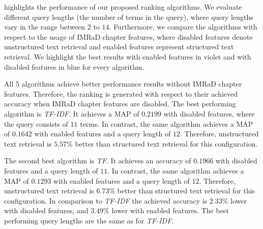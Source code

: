  highlights the performance of our proposed ranking algorithms. We evaluate different query lengths (the number of terms in the query), where query lengths vary in the range between $2$ to $14$. Furthermore, we compare the algorithms with respect to the usage of IMRaD chapter features, where disabled features denote unstructured text retrieval and enabled features represent structured text retrieval. We highlight the best results with enabled features in violet and with disabled features in blue for every algorithm.

All $5$ algorithms achieve better performance results without IMRaD chapter features. Therefore, the ranking is generated with respect to their achieved accuracy when IMRaD chapter features are disabled. The best performing algorithm is \textit{TF-IDF}. It achieves a MAP of $0.2199$ with disabled features, where the query consists of $11$ terms. In contrast, the same algorithm achieves a MAP of $0.1642$ with enabled features and a query length of $12$. Therefore, unstructured text retrieval is $5.57 \%$ better than structured text retrieval for this configuration.

The second best algorithm is \textit{TF}. It achieves an accuracy of $0.1966$ with disabled features and a query length of $11$. In contrast, the same algorithm achieves a MAP of $0.1293$ with enabled features and a query length of $12$. Therefore, unstructured text retrieval is $6.73 \%$ better than structured text retrieval for this configuration. In comparison to \textit{TF-IDF} the achieved accuracy is $2.33 \%$ lower with disabled features, and $3.49 \%$ lower with enabled features. The best performing query lengths are the same as for \textit{TF-IDF}.

